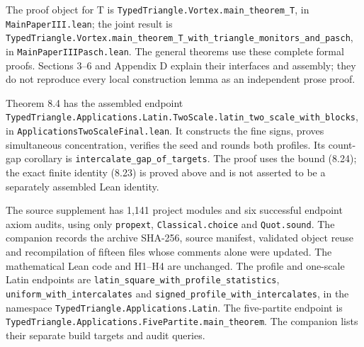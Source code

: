 \documentclass[english,11pt,a4paper]{article}
\begin{document}
The proof object for T is \texttt{Typed\allowbreak{}Triangle.\allowbreak{}Vortex.\allowbreak{}main\_\allowbreak{}theorem\_\allowbreak{}T}, in \texttt{Main\allowbreak{}Paper\allowbreak{}III.\allowbreak{}lean}; the joint result is \texttt{Typed\allowbreak{}Triangle.\allowbreak{}Vortex.\allowbreak{}main\_\allowbreak{}theorem\_\allowbreak{}T\_\allowbreak{}with\_\allowbreak{}triangle\_\allowbreak{}monitors\_\allowbreak{}and\_\allowbreak{}pasch}, in \texttt{Main\allowbreak{}Paper\allowbreak{}IIIPasch.\allowbreak{}lean}. The general theorems use these complete formal proofs. Sections 3--6 and Appendix D explain their interfaces and assembly; they do not reproduce every local construction lemma as an independent prose proof.

Theorem 8.4 has the assembled endpoint \texttt{Typed\allowbreak{}Triangle.\allowbreak{}Applications.\allowbreak{}Latin.\allowbreak{}Two\allowbreak{}Scale.\allowbreak{}latin\_\allowbreak{}two\_\allowbreak{}scale\_\allowbreak{}with\_\allowbreak{}blocks}, in \texttt{Applications\allowbreak{}Two\allowbreak{}Scale\allowbreak{}Final.\allowbreak{}lean}. It constructs the fine signs, proves simultaneous concentration, verifies the seed and rounds both profiles. Its count-gap corollary is \texttt{intercalate\_\allowbreak{}gap\_\allowbreak{}of\_\allowbreak{}targets}. The proof uses the bound (8.24); the exact finite identity (8.23) is proved above and is not asserted to be a separately assembled Lean identity.

The source supplement has 1,141 project modules and six successful endpoint axiom audits, using only \texttt{propext}, \texttt{Classical.\allowbreak{}choice} and \texttt{Quot.\allowbreak{}sound}. The companion records the archive SHA-256, source manifest, validated object reuse and recompilation of fifteen files whose comments alone were updated. The mathematical Lean code and H1--H4 are unchanged. The profile and one-scale Latin endpoints are \texttt{latin\_\allowbreak{}square\_\allowbreak{}with\_\allowbreak{}profile\_\allowbreak{}statistics}, \texttt{uniform\_\allowbreak{}with\_\allowbreak{}intercalates} and \texttt{signed\_\allowbreak{}profile\_\allowbreak{}with\_\allowbreak{}intercalates}, in the namespace \texttt{Typed\allowbreak{}Triangle.\allowbreak{}Applications.\allowbreak{}Latin}. The five-partite endpoint is \texttt{Typed\allowbreak{}Triangle.\allowbreak{}Applications.\allowbreak{}Five\allowbreak{}Partite.\allowbreak{}main\_\allowbreak{}theorem}. The companion lists their separate build targets and audit queries.
\end{document}
